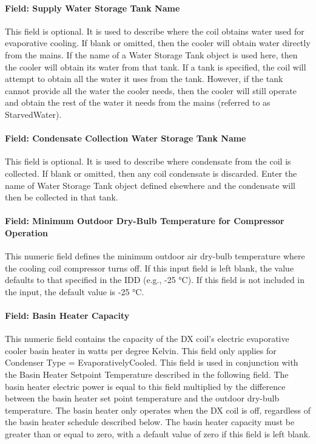 \paragraph{Field: Supply Water Storage Tank Name}\label{field-supply-water-storage-tank-name-2-000}

This field is optional. It is used to describe where the coil obtains water used for evaporative cooling. If blank or omitted, then the cooler will obtain water directly from the mains. If the name of a Water Storage Tank object is used here, then the cooler will obtain its water from that tank. If a tank is specified, the coil will attempt to obtain all the water it uses from the tank. However, if the tank cannot provide all the water the cooler needs, then the cooler will still operate and obtain the rest of the water it needs from the mains (referred to as StarvedWater).

\paragraph{Field: Condensate Collection Water Storage Tank Name}\label{field-condensate-collection-water-storage-tank-name-4}

This field is optional. It is used to describe where condensate from the coil is collected. If blank or omitted, then any coil condensate is discarded. Enter the name of Water Storage Tank object defined elsewhere and the condensate will then be collected in that tank.

\paragraph{Field: Minimum Outdoor Dry-Bulb Temperature for Compressor Operation}

This numeric field defines the minimum outdoor air dry-bulb temperature where the cooling coil compressor turns off. If this input field is left blank, the value defaults to that specified in the IDD (e.g., -25 °C). If this field is not included in the input, the default value is -25 °C.

\paragraph{Field: Basin Heater Capacity}\label{field-basin-heater-capacity-2-000}

This numeric field contains the capacity of the DX coil's electric evaporative cooler basin heater in watts per degree Kelvin. This field only applies for Condenser Type = EvaporativelyCooled. This field is used in conjunction with the Basin Heater Setpoint Temperature described in the following field. The basin heater electric power is equal to this field multiplied by the difference between the basin heater set point temperature and the outdoor dry-bulb temperature. The basin heater only operates when the DX coil is off, regardless of the basin heater schedule described below. The basin heater capacity must be greater than or equal to zero, with a default value of zero if this field is left blank.


